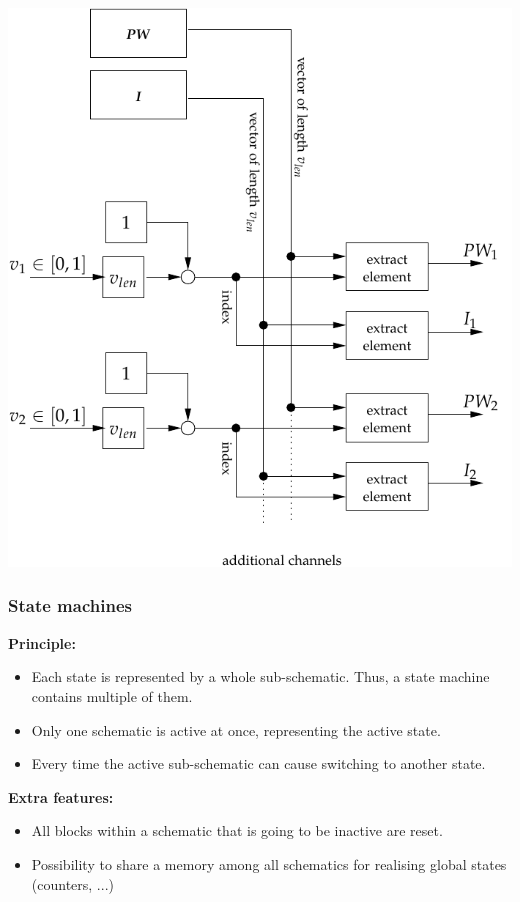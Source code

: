 \documentclass[serif,9pt,xcolor=dvipsnames]{beamer}
\begin{document}
\begin{frame}[fragile]
{     \begin{minipage}{0.55\linewidth}
\hspace{-1.8cm}
\vspace{2cm}
	\centering \includegraphics[width=1.0\linewidth]{figures/charge_control.pdf} 

     \end{minipage}    
  }

\end{frame}



\begin{frame}
  \frametitle{State machines}

  \textbf{Principle:}

  \begin{itemize}
   \item Each state is represented by a whole sub-schematic. Thus, a state machine contains multiple of them.
   \item Only one schematic is active at once, representing the active state.
   \item Every time the active sub-schematic can cause switching to another state.
  \end{itemize}

  \textbf{Extra features:}
  \begin{itemize}
   \item All blocks within a schematic that is going to be inactive are reset.
   \item Possibility to share a memory among all schematics for realising global states (counters, ...)
  \end{itemize}

  
  

\end{frame}
\end{document}
